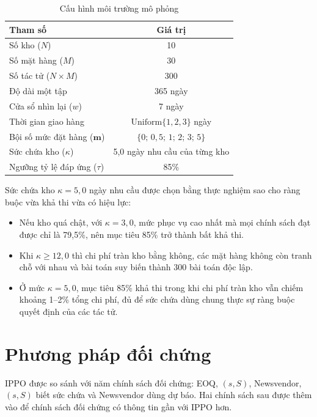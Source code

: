 \begin{table}[H]
    \centering
    \caption{Cấu hình môi trường mô phỏng}
    \label{tab:cauHinhEnv}
    \begin{tabular}{|l|c|}
        \hline
        Tham số & Giá trị \\
        \hline
        Số kho ($N$) & 10 \\ \hline
        Số mặt hàng ($M$) & 30 \\ \hline
        Số tác tử ($N \times M$) & 300 \\ \hline
        Độ dài một tập & 365 ngày \\ \hline
        Cửa sổ nhìn lại ($w$) & 7 ngày \\ \hline
        Thời gian giao hàng & $\text{Uniform}\{1, 2, 3\}$ ngày \\ \hline
        Bội số mức đặt hàng ($\mathbf{m}$) & $\{0;\,0{,}5;\,1;\,2;\,3;\,5\}$ \\ \hline
        Sức chứa kho ($\kappa$) & 5,0 ngày nhu cầu của từng kho \\ \hline
        Ngưỡng tỷ lệ đáp ứng ($\tau$) & 85\% \\
        \hline
    \end{tabular}
\end{table}

Sức chứa kho $\kappa = 5{,}0$ ngày nhu cầu được chọn bằng thực nghiệm sao cho ràng buộc vừa khả thi vừa có hiệu lực:
\begin{itemize}
    \item Nếu kho quá chật, với $\kappa = 3{,}0$, mức phục vụ cao nhất mà mọi chính sách đạt được chỉ là 79,5\%, nên mục tiêu 85\% trở thành bất khả thi.
    \item Khi $\kappa \ge 12{,}0$ thì chi phí tràn kho bằng không, các mặt hàng không còn tranh chỗ với nhau và bài toán suy biến thành 300 bài toán độc lập.
    \item Ở mức $\kappa = 5{,}0$, mục tiêu 85\% khả thi trong khi chi phí tràn kho vẫn chiếm khoảng 1--2\% tổng chi phí, đủ để sức chứa dùng chung thực sự ràng buộc quyết định của các tác tử.
\end{itemize}

\section{Phương pháp đối chứng}
\label{sec:baselines}

IPPO được so sánh với năm chính sách đối chứng: EOQ, $(s, S)$, Newsvendor, $(s, S)$ biết sức chứa và Newsvendor dùng dự báo. Hai chính sách sau được thêm vào để chính sách đối chứng có thông tin gần với IPPO hơn.

